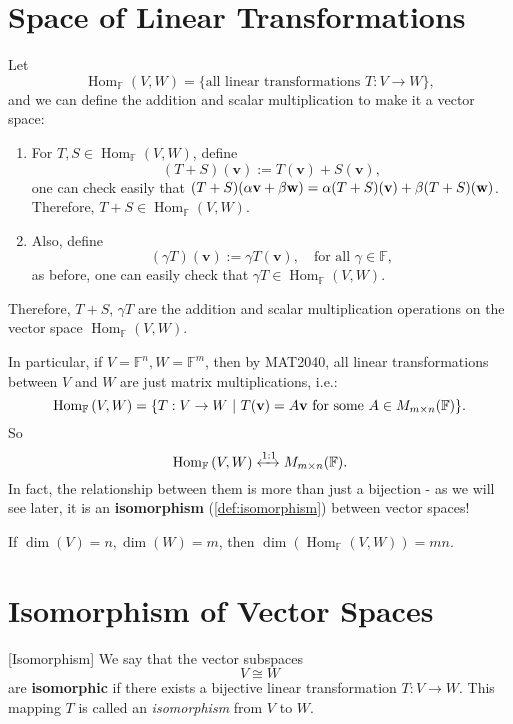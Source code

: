 \section{Space of Linear Transformations}
\begin{definition}
Let
\[ {\operatorname{Hom}}_{\mathbb{F}}\left( V, W\right) = \{ \text{all linear transformations } T : V \rightarrow W \}, \]
and we can define the addition and scalar multiplication to make it a vector space:

\begin{enumerate}
  \item For \(T, S \in \operatorname{Hom}_{\mathbb{F}}\left( V, W\right)\), define
  \[
  (T + S)(\mathbf{v}) := T(\mathbf{v}) + S(\mathbf{v}),
  \]
  one can check easily that $(T + S)(\alpha{\bf v} + \beta{\bf w}) = \alpha(T + S)({\bf v}) + \beta(T + S)({\bf w})$. Therefore, \(T + S \in \operatorname{Hom}_{\mathbb{F}}\left( V, W\right)\).

  \item Also, define
  \[
  (\gamma T)(\mathbf{v}) := \gamma T(\mathbf{v}), \quad \text{for all } \gamma \in \mathbb{F},
  \]
  as before, one can easily check that \(\gamma T \in \operatorname{Hom}_{\mathbb{F}}\left( V, W\right)\).
\end{enumerate}
Therefore, $T+S$, $\gamma T$ are the addition and scalar multiplication operations on the vector space $\operatorname{Hom}_{\mathbb{F}}\left( V, W\right)$.

\medskip   
In particular, if \(V = \mathbb{F}^n, W = \mathbb{F}^{m}\), then by MAT2040, all linear transformations between $V$ and $W$ are just matrix multiplications, i.e.:
\[ \operatorname{Hom}_{\mathbb{F}}\left( V, W\right) = \{T:V \to W\ |\ T({\bf v}) = A{\bf v} \text{ for some } A\in M_{m \times n}(\mathbb{F})\}. \]
So 
$$\operatorname{Hom}_{\mathbb{F}}\left( V, W\right)\xleftrightarrow{1:1} M_{m \times n}(\mathbb{F}).$$ 
In fact, the relationship between them is more than just a bijection - as we will see later, it is an {\bf isomorphism} (\autoref{def:isomorphism}) between vector spaces!
\end{definition}

\begin{proposition}
If \(\dim(V) = n, \dim(W) = m\), then \(\dim\left( \operatorname{Hom}_{\mathbb{F}}(V, W) \right) = mn\).
\end{proposition}



\section{Isomorphism of Vector Spaces}
\begin{definition} \label{def:isomorphism}
[Isomorphism] We say that the vector subspaces 
\[V \cong W\]
are {\bf isomorphic} if there exists a bijective linear transformation \(T : V \rightarrow W\). This mapping \(T\) is called an \emph{isomorphism} from \(V\) to \(W\).
\end{definition}

